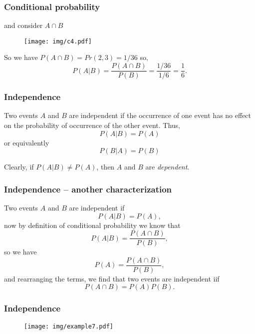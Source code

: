 \documentclass[notes=show,handout]{beamer}\usepackage[]{graphicx}\usepackage[]{color}
\newcommand{\nn}{\nonumber}
\begin{document}
\begin{frame}
\frametitle{Conditional probability}

\begin{example} [A check]
and consider $A \cap B$

\begin{figure}[h!]
\centering
\texttt{[image: img/c4.pdf]}
\end{figure}
So we have  $P(A \cap B) = Pr (2,3) = 1/36$ so,
$$
P(A\vert B) = \frac{P(A \cap B)}{P(B)}  =  \frac{1/36}{1/6} = \frac{1}{6}. \nn
$$
\end{example}


\end{frame}


\begin{frame}
\frametitle{Independence}
\begin{definition}
Two events $A$ and $B$ are independent if the occurrence of one event has no effect on the probability of occurrence of the other event. Thus,
$$
P(A\vert B) = P(A)
$$
or equivalently
$$
P(B\vert A) = P(B)
$$
\end{definition}

Clearly, if $P(A\vert B) \neq P(A)$, then $A$ and $B$ are \textit{dependent}.


\end{frame}


\begin{frame}
\frametitle{Independence -- another characterization}

Two events $A$ and $B$ are independent if
$$
P(A \vert B) = {P(A)},
$$
now by definition of conditional probability we know that
$$
P(A \vert B) = \frac{P(A \cap B)}{P(B)},
$$
so we have
$$
P(A) = \frac{P(A \cap B)}{P(B)},
$$
and rearranging the terms, we find that two events are independent iif
$$
P(A\cap B) = P(A) P(B).
$$

\end{frame}




\begin{frame}
\frametitle{Independence}

\begin{example}
\begin{figure}[h!]
\centering
\texttt{[image: img/example7.pdf]}
\end{figure}

\end{example}




\end{frame}
\end{document}
